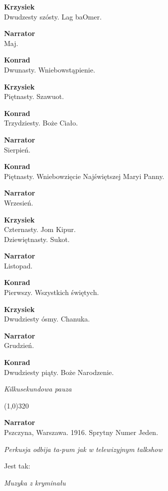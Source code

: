 \documentclass[11pt,a4paper,oneside]{article}
\begin{document}
{\color{krzysiek}
\textbf{Krzysiek}\\
Dwudzesty szósty. Lag baOmer.
}

\textbf{Narrator}\\
Maj.

{\color{konrad}
\textbf{Konrad}\\
Dwunasty. Wniebowstąpienie.
}

{\color{krzysiek}
\textbf{Krzysiek}\\
Piętnasty. Szawuot.
}

{\color{konrad}
\textbf{Konrad}\\
Trzydziesty. Boże Ciało.
}

\textbf{Narrator}\\
Sierpień.

\newpage
{\color{konrad}
\textbf{Konrad}\\
Piętnasty. Wniebowzięcie Najświętszej Maryi Panny.
}

\textbf{Narrator}\\
Wrzesień.

{\color{krzysiek}
\textbf{Krzysiek}\\
Czternasty. Jom Kipur.\\
Dziewiętnasty. Sukot.
}

\textbf{Narrator}\\
Listopad.

{\color{konrad}
\textbf{Konrad}\\
Pierwszy. Wszystkich świętych.
}

{\color{krzysiek}
\textbf{Krzysiek}\\
Dwudziesty ósmy. Chanuka.
}

\textbf{Narrator}\\
Grudzień.

{\color{konrad}
\textbf{Konrad}\\
Dwudziesty piąty. Boże Narodzenie.
}

{\color{light-gray} \emph{Kilkusekundowa pauza}}

\line(1,0){320}

\textbf{Narrator}\\
Pszczyna, Warszawa. 1916. Sprytny Numer Jeden. 

{\color{light-gray} \emph{Perkusja odbija ta-pum jak w telewizyjnym talkshow}}

Jest tak: 

{\color{light-gray} \emph{Muzyka z kryminału}}
\end{document}
